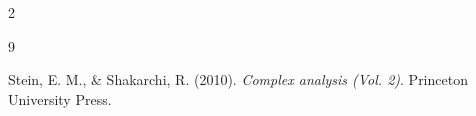 \documentclass[a4paper, 11pt]{extarticle}
\begin{document}
\begin{multicols*}{2}
  
   


\begin{thebibliography}{9}

Stein, E. M., \& Shakarchi, R. (2010). \emph{Complex analysis (Vol. 2)}. Princeton University Press.


\end{thebibliography}

\end{multicols*}


\end{document}
